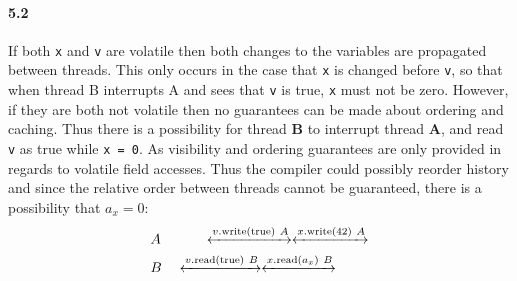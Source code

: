 \documentclass[12pt,letterpaper,titlepage]{article}
\newcommand{\methodcall}[4]{\textlangle{}\emph{#1.#2}(#3) \emph{\textbf{#4}}\textrangle{}}
\newcommand{\pre}{$\rightarrow$}
\begin{document}
%    
%    
    
    \paragraph{5.2} If both \texttt{x} and \texttt{v} are volatile then both changes to the variables are propagated between threads. This only occurs in the case that \texttt{x} is changed before \texttt{v}, so that when thread B interrupts A and sees that \texttt{v} is true, \texttt{x} must not be zero. However, if they are both not volatile then no guarantees can be made about ordering and caching. Thus there is a possibility for thread \textbf{B} to interrupt thread \textbf{A}, and read \texttt{v} as true while \texttt{x = 0}. As visibility and ordering guarantees are only provided in regards to volatile field accesses. Thus the compiler could possibly reorder history and since the relative order between threads cannot be guaranteed, there is a possibility that $a_x = 0$:
     \begin{align*}
       &A \quad \qquad \xleftrightarrow{v.\text{write}(\text{true}) \ A} \xleftrightarrow{x.\text{write}(42) \ A} \\
       &B \quad \xleftrightarrow{v.\text{read}(\text{true}) \ B} \xleftrightarrow{x.\text{read}(a_x) \ B}
     \end{align*}
    
\end{document}
